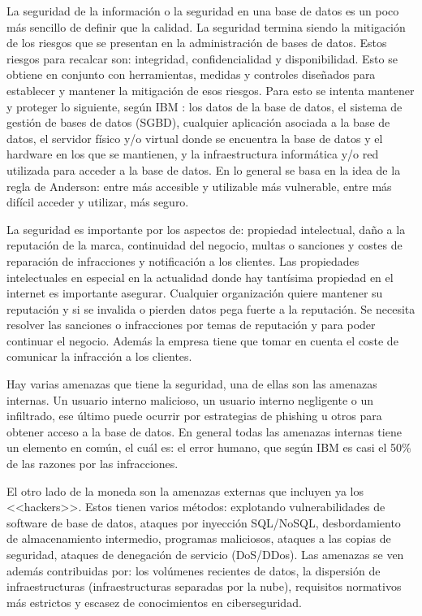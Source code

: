 \documentclass[12pt, article, natbib]{IEEEtran}
\begin{document}
La seguridad de la información o la seguridad en una base de datos es un poco más sencillo de definir que la calidad. La seguridad termina siendo la mitigación de los riesgos que se presentan en la administración de bases de datos. Estos riesgos para recalcar son: integridad, confidencialidad y disponibilidad. Esto se obtiene en conjunto con herramientas, medidas y controles diseñados para establecer y mantener la mitigación de esos riesgos. Para esto se intenta mantener y proteger lo siguiente, según IBM \cite{ibmseguridad}: los datos de la base de datos, el sistema de gestión de bases de datos (SGBD), cualquier aplicación asociada a la base de datos, el servidor físico y/o virtual donde se encuentra la base de datos y el hardware en los que se mantienen, y la infraestructura informática y/o red utilizada para acceder a la base de datos. En lo general se basa en la idea de la regla de Anderson: entre más accesible y utilizable más vulnerable, entre más difícil acceder y utilizar, más seguro.

La seguridad es importante por los aspectos de: propiedad intelectual, daño a la reputación de la marca, continuidad del negocio, multas o sanciones y costes de reparación de infracciones y notificación a los clientes. Las propiedades intelectuales en especial en la actualidad donde hay tantísima propiedad en el internet es importante asegurar. Cualquier organización quiere mantener su reputación y si se invalida o pierden datos pega fuerte a la reputación. Se necesita resolver las sanciones o infracciones por temas de reputación y para poder continuar el negocio. Además la empresa tiene que tomar en cuenta el coste de comunicar la infracción a los clientes.

Hay varias amenazas que tiene la seguridad, una de ellas son las amenazas internas. Un usuario interno malicioso, un usuario interno negligente o un infiltrado, ese último puede ocurrir por estrategias de phishing u otros para obtener acceso a la base de datos. En general todas las amenazas internas tiene un elemento en común, el cuál es: el error humano, que según IBM es casi el 50\% de las razones por las infracciones.

El otro lado de la moneda son la amenazas externas que incluyen ya los <<hackers>>. Estos tienen varios métodos: explotando vulnerabilidades de software de base de datos, ataques por inyección SQL/NoSQL, desbordamiento de almacenamiento intermedio, programas maliciosos, ataques a las copias de seguridad, ataques de denegación de servicio (DoS/DDos). Las amenazas se ven además contribuidas por: los volúmenes recientes de datos, la dispersión de infraestructuras (infraestructuras separadas por la nube), requisitos normativos más estrictos y escasez de conocimientos en ciberseguridad.
\end{document}
